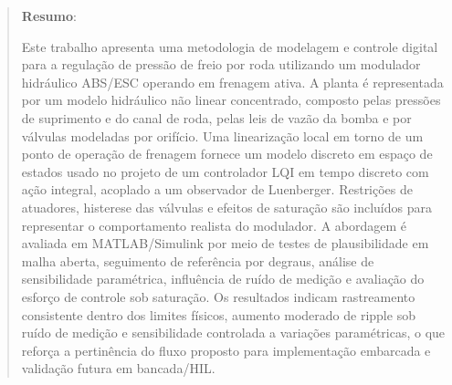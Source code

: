 \documentclass[a4paper]{ifacconf}
\begin{document}
\begin{frontmatter}
\begin{abstract}
         \vskip 1mm%
         {\noindent \bf Resumo}:

         Este trabalho apresenta uma metodologia de modelagem e controle digital para a regulação de pressão de freio por roda utilizando um modulador hidráulico ABS/ESC operando em frenagem ativa. A planta é representada por um modelo hidráulico não linear concentrado, composto pelas pressões de suprimento e do canal de roda, pelas leis de vazão da bomba e por válvulas modeladas por orifício. Uma linearização local em torno de um ponto de operação de frenagem fornece um modelo discreto em espaço de estados usado no projeto de um controlador LQI em tempo discreto com ação integral, acoplado a um observador de Luenberger. Restrições de atuadores, histerese das válvulas e efeitos de saturação são incluídos para representar o comportamento realista do modulador. A abordagem é avaliada em MATLAB/Simulink por meio de testes de plausibilidade em malha aberta, seguimento de referência por degraus, análise de sensibilidade paramétrica, influência de ruído de medição e avaliação do esforço de controle sob saturação. Os resultados indicam rastreamento consistente dentro dos limites físicos, aumento moderado de ripple sob ruído de medição e sensibilidade controlada a variações paramétricas, o que reforça a pertinência do fluxo proposto para implementação embarcada e validação futura em bancada/HIL.
      \end{abstract}


\end{frontmatter}
\end{document}
